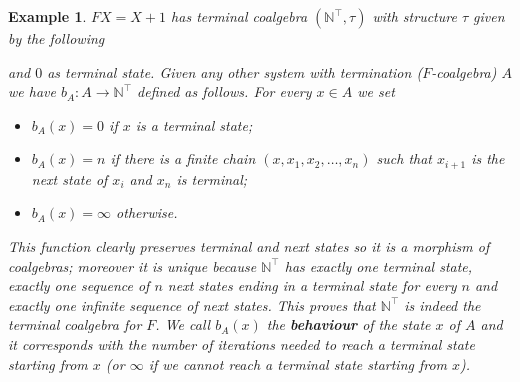 \documentclass[letterpaper, 11pt, oneside]{memoir}
\theoremstyle{myteo}
\newtheorem{example}[theorem]{Example}
\numberwithin{equation}{section}
\begin{document}
\begin{example}
  \label{ex:terminalcoalgebra1}
  \(FX = X + 1\) has terminal coalgebra \((\mathbb{N}^\top, \tau)\) with structure \(\tau\) given by the following
  \begin{center}
  \end{center}
  and \(0\) as terminal state.
  Given any other system with termination (\(F\)-coalgebra) \(A\) we have \(b_A : A \to \mathbb{N}^\top\) defined as follows.
  For every \(x \in A\) we set
  \begin{itemize}
  \item[1.] \(b_A(x) = 0\) if \(x\) is a terminal state;
  \item[2.] \(b_A(x) = n\) if there is a finite chain \((x, x_1, x_2, \ldots, x_n)\) such that \(x_{i+1}\) is the next state of \(x_i\) and \(x_n\) is terminal;
  \item[3.] \(b_A(x) = \infty\) otherwise.
  \end{itemize}
  This function clearly preserves terminal and next states so it is a morphism of coalgebras; moreover it is unique because \(\mathbb{N}^\top\) has exactly one terminal state, exactly one sequence of \(n\) next states ending in a terminal state for every \(n\) and exactly one infinite sequence of next states.
  This proves that \(\mathbb{N}^\top\) is indeed the terminal coalgebra for \(F\).
  We call \(b_A(x)\) the \textbf{behaviour} of the state \(x\) of \(A\) and it corresponds with the number of iterations needed to reach a terminal state starting from \(x\) (or \(\infty\) if we cannot reach a terminal state starting from \(x\)).
\end{example}
\end{document}
